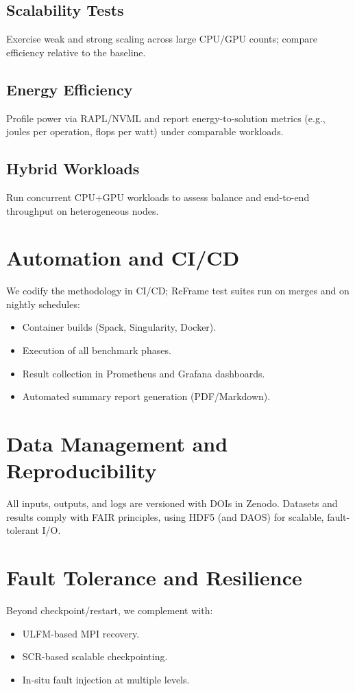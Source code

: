 \subsection{Scalability Tests}
Exercise weak and strong scaling across large CPU/GPU counts; compare efficiency relative to the baseline.

\subsection{Energy Efficiency}
Profile power via RAPL/NVML and report energy-to-solution metrics (e.g., joules per operation, flops per watt) under comparable workloads.

\subsection{Hybrid Workloads}
Run concurrent CPU+GPU workloads to assess balance and end-to-end throughput on heterogeneous nodes.

\section{Automation and CI/CD}
We codify the methodology in CI/CD; ReFrame test suites run on merges and on nightly schedules:
\begin{itemize}
  \item Container builds (Spack, Singularity, Docker).
  \item Execution of all benchmark phases.
  \item Result collection in Prometheus and Grafana dashboards.
  \item Automated summary report generation (PDF/Markdown).
\end{itemize}

\section{Data Management and Reproducibility}
All inputs, outputs, and logs are versioned with DOIs in Zenodo. Datasets and results comply with FAIR principles, using HDF5 (and DAOS) for scalable, fault-tolerant I/O.

\section{Fault Tolerance and Resilience}
Beyond checkpoint/restart, we complement with:
\begin{itemize}
  \item ULFM-based MPI recovery.
  \item SCR-based scalable checkpointing.
  \item In-situ fault injection at multiple levels.
\end{itemize}

